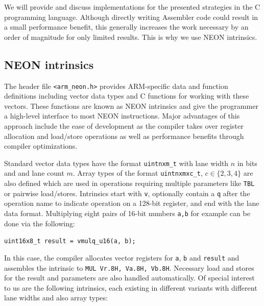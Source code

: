 \documentclass[12pt]{report}
\begin{document}
We will provide and discuss implementations for the presented strategies in the
C programming language. Although directly writing Assembler code could result
in a small performance benefit, this generally increases the work necessary by
an order of magnitude for only limited results. This is why we use NEON
intrinsics.

\subsection{NEON intrinsics}

The header file \texttt{<arm\_neon.h>} provides ARM-specific data and function
definitions including vector data types and C functions for working with these
vectors. These functions are known as NEON intrinsics and give the programmer a
high-level interface to most NEON instructions. Major advantages of this
approach include the ease of development as the compiler takes over register
allocation and load/store operations as well as performance benefits through
compiler optimizations.

Standard vector data types have the format \texttt{uintnxm\_t} with lane width
$n$ in bits and and lane count $m$. Array types of the format
\texttt{uintnxmxc\_t}, $c\in\{2,3,4\}$ are also defined which are used in
operations requiring multiple parameters like \texttt{TBL} or pairwise
load/stores. Intrinsics start with \texttt{v}, optionally contain a \texttt{q}
after the operation name to indicate operation on a 128-bit register, and end
with the lane data format. Multiplying eight pairs of 16-bit numbers
\texttt{a,b} for example can be done via the following:

\begin{center}
    \texttt{uint16x8\_t result = vmulq\_u16(a, b);}
\end{center}

In this case, the compiler allocates vector registers for \texttt{a},
\texttt{b} and \texttt{result} and assembles the intrinsic to \texttt{MUL
Vr.8H, Va.8H, Vb.8H}. Necessary load and stores for the result and parameters
are also handled automatically. Of special interest to us are the following
intrinsics, each existing in different variants with different lane widths and
also array types: \\
\end{document}
